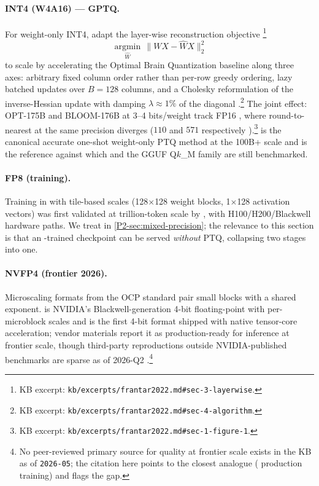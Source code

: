 \paragraph{INT4 (W4A16) --- GPTQ.}
For weight-only INT4, \citet{frantar2022} adapt the layer-wise
reconstruction objective \citep[\S 3, Eq.~1]{frantar2022}\footnote{KB
excerpt: \nolinkurl{kb/excerpts/frantar2022.md#sec-3-layerwise}.}
\begin{equation}
\operatorname*{argmin}_{\widehat{W}} \, \|W X - \widehat{W} X\|_2^2
\label{eq:gptq-objective}
\end{equation}
to  scale by accelerating the Optimal Brain Quantization baseline
along three axes: arbitrary fixed column order rather than per-row
greedy ordering, lazy batched updates over $B = 128$ columns, and a
Cholesky reformulation of the inverse-Hessian update with damping
$\lambda \approx 1\%$ of the diagonal \citep[\S 4]{frantar2022}.\footnote{KB
excerpt: \nolinkurl{kb/excerpts/frantar2022.md#sec-4-algorithm}.} The
joint effect: OPT-175B and BLOOM-176B at 3--4 bits/weight track FP16
, where round-to-nearest at the same precision diverges
($110$ and $571$ respectively
\citep[\S 1, Fig.~1]{frantar2022}).\footnote{KB excerpt:
\nolinkurl{kb/excerpts/frantar2022.md#sec-1-figure-1}.}  is the
canonical accurate one-shot weight-only PTQ method at the 100B+ scale
and is the reference against which  and the GGUF Q$k$\_$\!$M family
are still benchmarked.

\paragraph{FP8 (training).}
Training in  with tile-based scales (128$\times$128 weight blocks,
1$\times$128 activation vectors) was first validated at trillion-token
scale by  \citep[\S 2.5]{deepseek-v3}, with H100/H200/Blackwell
hardware  paths. We treat  in
\cref{P2-sec:mixed-precision}; the relevance to this
section is that an -trained checkpoint can be served \emph{without}
PTQ, collapsing two stages into one.

\paragraph{NVFP4 (frontier 2026).}
Microscaling formats from the OCP standard pair small blocks with a
shared exponent.  is NVIDIA's Blackwell-generation 4-bit
floating-point with per-microblock scales and is the first 4-bit format
shipped with native tensor-core acceleration; vendor materials report
it as production-ready for inference at frontier scale, though
third-party reproductions outside NVIDIA-published benchmarks are
sparse as of 2026-Q2 \citep[FORUM-SIGNAL]{deepseek-v3}.\footnote{No
peer-reviewed primary source for   quality at frontier scale
exists in the KB as of \texttt{2026-05}; the citation here points to
the closest analogue ( production training) and flags the gap.}

